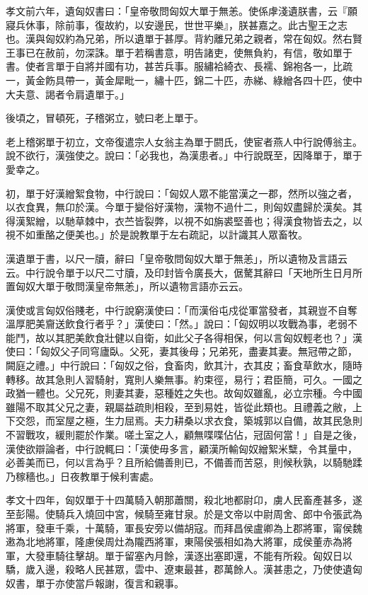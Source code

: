 \begin{pinyinscope}
孝文前六年，遺匈奴書曰：「皇帝敬問匈奴大單于無恙。使係虖淺遺朕書，云『願寢兵休事，除前事，復故約，以安邊民，世世平樂』，朕甚嘉之。此古聖王之志也。漢與匈奴約為兄弟，所以遺單于甚厚。背約離兄弟之親者，常在匈奴。然右賢王事已在赦前，勿深誅。單于若稱書意，明告諸吏，使無負約，有信，敬如單于書。使者言單于自將并國有功，甚苦兵事。服繡袷綺衣、長襦、錦袍各一，比疏一，黃金飭具帶一，黃金犀毗一，繡十匹，錦二十匹，赤綈、綠繒各四十匹，使中大夫意、謁者令肩遺單于。」

後頃之，冒頓死，子稽粥立，號曰老上單于。

老上稽粥單于初立，文帝復遣宗人女翁主為單于閼氏，使宦者燕人中行說傅翁主。說不欲行，漢強使之。說曰：「必我也，為漢患者。」中行說既至，因降單于，單于愛幸之。

初，單于好漢繒絮食物，中行說曰：「匈奴人眾不能當漢之一郡，然所以強之者，以衣食異，無卬於漢。今單于變俗好漢物，漢物不過什二，則匈奴盡歸於漢矣。其得漢絮繒，以馳草棘中，衣苎皆裂弊，以視不如旃裘堅善也；得漢食物皆去之，以視不如重酪之便美也。」於是說教單于左右疏記，以計識其人眾畜牧。

漢遺單于書，以尺一牘，辭曰「皇帝敬問匈奴大單于無恙」，所以遺物及言語云云。中行說令單于以尺二寸牘，及印封皆令廣長大，倨驁其辭曰「天地所生日月所置匈奴大單于敬問漢皇帝無恙」，所以遺物言語亦云云。

漢使或言匈奴俗賤老，中行說窮漢使曰：「而漢俗屯戍從軍當發者，其親豈不自奪溫厚肥美齎送飲食行者乎？」漢使曰：「然。」說曰：「匈奴明以攻戰為事，老弱不能鬥，故以其肥美飲食壯健以自衛，如此父子各得相保，何以言匈奴輕老也？」漢使曰：「匈奴父子同穹廬臥。父死，妻其後母；兄弟死，盡妻其妻。無冠帶之節，闕庭之禮。」中行說曰：「匈奴之俗，食畜肉，飲其汁，衣其皮；畜食草飲水，隨時轉移。故其急則人習騎射，寬則人樂無事。約束徑，易行；君臣簡，可久。一國之政猶一體也。父兄死，則妻其妻，惡種姓之失也。故匈奴雖亂，必立宗種。今中國雖陽不取其父兄之妻，親屬益疏則相殺，至到易姓，皆從此類也。且禮義之敝，上下交怨，而室屋之極，生力屈焉。夫力耕桑以求衣食，築城郭以自備，故其民急則不習戰攻，緩則罷於作業。嗟土室之人，顧無喋喋佔佔，冠固何當！」自是之後，漢使欲辯論者，中行說輒曰：「漢使毋多言，顧漢所輸匈奴繒絮米糱，令其量中，必善美而已，何以言為乎？且所給備善則已，不備善而苦惡，則候秋孰，以騎馳蹂乃稼穡也。」日夜教單于候利害處。

孝文十四年，匈奴單于十四萬騎入朝那蕭關，殺北地都尉卬，虜人民畜產甚多，遂至彭陽。使騎兵入燒回中宮，候騎至雍甘泉。於是文帝以中尉周舍、郎中令張武為將軍，發車千乘，十萬騎，軍長安旁以備胡寇。而拜昌侯盧卿為上郡將軍，甯侯魏遫為北地將軍，隆慮侯周灶為隴西將軍，東陽侯張相如為大將軍，成侯董赤為將軍，大發車騎往擊胡。單于留塞內月餘，漢逐出塞即還，不能有所殺。匈奴日以驕，歲入邊，殺略人民甚眾，雲中、遼東最甚，郡萬餘人。漢甚患之，乃使使遺匈奴書，單于亦使當戶報謝，復言和親事。


\end{pinyinscope}
